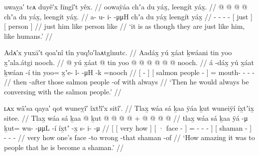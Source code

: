 \ex\label{ex:100-190-resemble-like-people}%
%
\begingl
	\glpreamble	uwaỵa′ tcᴀ duyê′x łīngî′t yêx. //
	\glpreamble	oowaÿáa chʼa du yáx̱, leengít yáx̱. //
	\gla	{} @ {} @ {} @ {} @ {} 
		{} chʼa du yáx̱, {} 
		{} leengít yáx̱. {} //
	\glb	a- u- i-  -μμH 
		{} chʼa du yáx̱ {}
		{} leengít yáx̱ {} //
	\glc	{}- - -  -
		{}[ just   {}]
		{}[ person  {}] //
	\gld	{} {} {} {} {}
		{} just him like {}
		{} person like {} //
	\glft	‘it is as though they are just like him, like humans.’
		//
\endgl
\xe

\ex\label{ex:100-191-converse-with-salmon-people}%
%
\begingl
	\glpreamble	Adᴀ′x yuxā′t qoa′nî tîn yuq!o′łaᴀtgînutc. //
	\glpreamble	Aadáx̱ yú x̱áat ḵwáani tin yoo x̱ʼala.átgi nooch. //
	\gla	{}  @ {} {} 
		{} yú x̱áat  @ {} tin {}
		yoo @  @ {} @ {} @ {} @ {} @ \•nooch. //
	\glb	{} á -dáx̱ {}
		{} yú x̱áat ḵwáan -í tin {} 
		yoo= x̱ʼe- l-  -μH -k =nooch //
	\glc	{}[  - {}]
		{}[  salmon people -  {}]
		= mouth- -  - - \• //
	\gld	{} then -after {}
		{} those salmon people -of with {}
		  {} {} {} {} \•always //
	\glft	‘Then he would always be conversing with the salmon people.’
		//
\endgl
\xe

\ex\label{ex:100-192-converse-with-salmon-people}%
%
\begingl
	\glpreamble	ʟᴀx wâ′sa qaya′ qot wuneỵî′ îxt!î′x sitî′. //
	\glpreamble	Tlax̱ wáa sá ḵaa ÿáa ḵut wuneiÿí íx̱tʼix̱ sitee. //
	\gla	{} {} Tlax̱ wáa sá {} 
			{} ḵaa  @ {} {}
			ḵut @  @ {} @ {} @ {} {} +
		{}  @ {} {} 
		 @ {} @ {} @ {} //
	\glb	{} {} tlax̱ wáa sá {}
			{} ḵaa ÿá -μ {}
			ḵut= wu-  -μμL -í {}
		{} íx̱tʼ -x̱ {}
		s- i-  -μ //
	\glc	{}[ {}[ very how  {}]
			{}[ · face - {}]
			= -  - - {}]
		{}[ shaman - {}]
		- -  - //
	\gld	{} {} very how  {}
			{} one’s face -to {} 
			wrong\•  {} {} -that {}
		{} shaman -of {}
		 {} {} {} //
	\glft	‘How amazing it was to people that he is become a shaman.’
		//
\endgl
\xe

